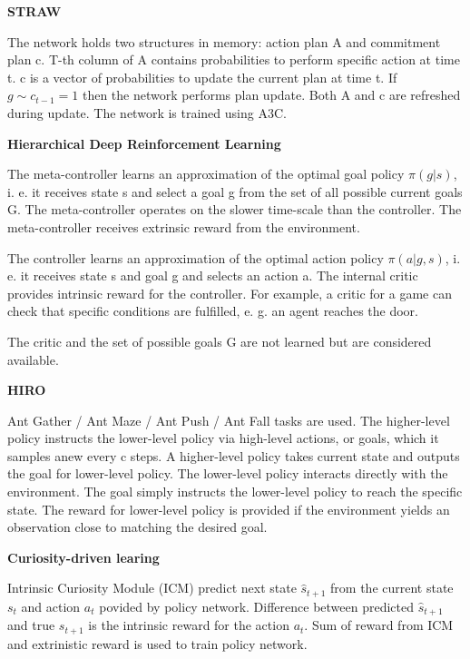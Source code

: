 \documentclass{article}
\begin{document}
\textbf{STRAW}~\citep{Vezhnevets2016StrategicAW}

The network holds two structures in memory: action plan A and commitment plan c. T-th column of A contains probabilities to perform specific action at time t. c is a vector of probabilities to update the current plan at time t. If $g \sim c_{t-1} = 1$ then the network performs plan update. Both A and c are refreshed during update. The network is trained using A3C.

\textbf{Hierarchical Deep Reinforcement Learning}~\citep{Kulkarni2016HierarchicalDR}

The meta-controller learns an approximation of the optimal goal policy $\pi(g|s)$, i. e. it receives state s and select a goal g from the set of all possible current goals G. The meta-controller operates on the slower time-scale than the controller. The meta-controller receives extrinsic reward from the environment.

The controller learns an approximation of the optimal action policy $\pi(a|g,s)$, i. e. it receives state s and goal g and selects an action a. The internal critic provides intrinsic reward for the controller. For example, a critic for a game can check that specific conditions are fulfilled, e. g. an agent reaches the door.

The critic and the set of possible goals G are not learned but are considered available.

\textbf{HIRO}~\citep{Nachum2018DataEfficientHR}

Ant Gather / Ant Maze / Ant Push / Ant Fall tasks are used. The higher-level policy instructs the lower-level policy via high-level actions, or goals, which it samples anew every c steps. A higher-level policy takes current state and outputs the goal for lower-level policy. The lower-level policy interacts directly with the environment. The goal simply instructs the lower-level policy to reach the specific state. The reward for lower-level policy is provided if the environment yields an observation close to matching the desired goal.

\textbf{Curiosity-driven learing}~\citep{Pathak2017CuriosityDrivenEB}

Intrinsic Curiosity Module (ICM) predict next state $\hat{s}_{t+1}$ from the current state $s_t$ and action $a_t$ povided by policy network. Difference between predicted $\hat{s}_{t+1}$ and true $s_{t+1}$ is the intrinsic reward for the action $a_t$. Sum of reward from ICM and extrinistic reward is used to train policy network.
\end{document}

